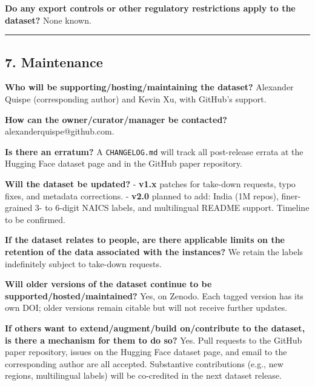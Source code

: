 \textbf{Do any export controls or other regulatory restrictions apply to the
dataset?}
None known.

\begin{center}\rule{0.5\linewidth}{0.5pt}\end{center}

\hypertarget{maintenance}{%
\subsection{7. Maintenance}\label{maintenance}}

\textbf{Who will be supporting/hosting/maintaining the dataset?}
Alexander Quispe (corresponding author) and Kevin Xu, with GitHub's
support.

\textbf{How can the owner/curator/manager be contacted?}
alexanderquispe@github.com.

\textbf{Is there an erratum?}
A \texttt{CHANGELOG.md} will track all post-release errata at the Hugging
Face dataset page and in the GitHub paper repository.

\textbf{Will the dataset be updated?}
- \textbf{v1.x} patches for take-down requests, typo fixes, and metadata
corrections.
- \textbf{v2.0} planned to add: India (1M repos), finer-grained 3- to
6-digit NAICS labels, and multilingual README support. Timeline to
be confirmed.

\textbf{If the dataset relates to people, are there applicable limits on the
retention of the data associated with the instances?}
We retain the labels indefinitely subject to take-down requests.

\textbf{Will older versions of the dataset continue to be supported/hosted/maintained?}
Yes, on Zenodo. Each tagged version has its own DOI; older versions
remain citable but will not receive further updates.

\textbf{If others want to extend/augment/build on/contribute to the dataset,
is there a mechanism for them to do so?}
Yes. Pull requests to the GitHub paper repository, issues on the
Hugging Face dataset page, and email to the corresponding author are
all accepted. Substantive contributions (e.g., new regions,
multilingual labels) will be co-credited in the next dataset release.

